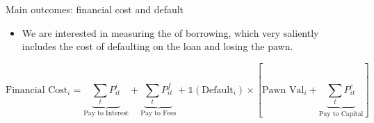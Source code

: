 \documentclass[8pt]{beamer}
\begin{document}



\begin{frame}{Main outcomes: financial cost and default}
\label{fc_cost}
\begin{itemize}
    \item We are interested in measuring the   \hyperlink{fc_dist}{}  of borrowing, which very saliently includes the cost of defaulting on the loan and losing the pawn.
\end{itemize}

   \begin{equation*}
    \text{Financial Cost}_i =  \underbrace{\sum_t P^i_{it}}_{\text{Pay to Interest}} + \underbrace{\sum_t P^f_{it}}_{\text{Pay to Fees}}  + \mathds{1}(\text{Default}_i) \times \left[\text{Pawn Val}_i + \underbrace{\sum_t P^c_{it}}_{\text{Pay to Capital}} \right]
   \end{equation*}


\end{frame}
\end{document}
